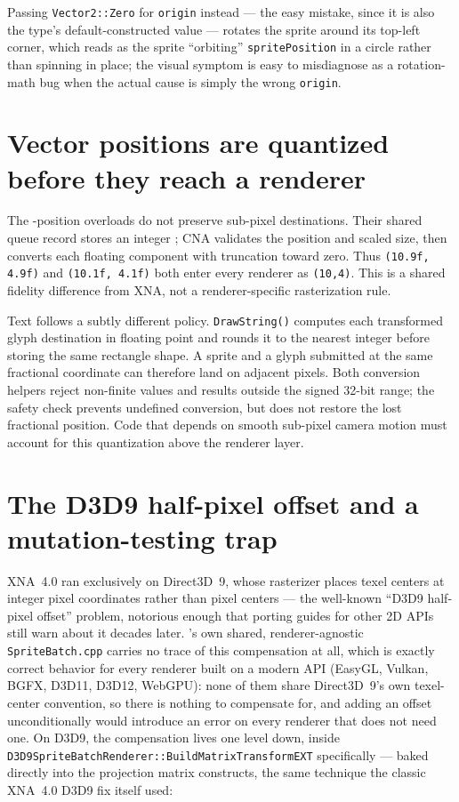 Passing \texttt{Vector2::Zero} for \texttt{origin} instead --- the easy mistake, since it is
also the type's default-constructed value --- rotates the sprite around its top-left corner,
which reads as the sprite ``orbiting'' \texttt{spritePosition} in a circle rather than spinning
in place; the visual symptom is easy to misdiagnose as a rotation-math bug when the actual
cause is simply the wrong \texttt{origin}.

\section{Vector positions are quantized before they reach a renderer}

The -position overloads do not preserve sub-pixel destinations. Their shared
queue record stores an integer ; CNA validates the position and scaled size,
then converts each floating component with truncation toward zero. Thus \texttt{(10.9f, 4.9f)}
and \texttt{(10.1f, 4.1f)} both enter every renderer as \texttt{(10,4)}. This is a shared
 fidelity difference from XNA, not a renderer-specific rasterization rule.

Text follows a subtly different policy. \texttt{DrawString()} computes each transformed glyph
destination in floating point and rounds it to the nearest integer before storing the same
rectangle shape. A sprite and a glyph submitted at the same fractional coordinate can therefore
land on adjacent pixels. Both conversion helpers reject non-finite values and results outside
the signed 32-bit range; the safety check prevents undefined conversion, but does not restore the
lost fractional position. Code that depends on smooth sub-pixel camera motion must account for
this quantization above the renderer layer.

\section{The D3D9 half-pixel offset and a mutation-testing trap}

XNA~4.0 ran exclusively on Direct3D~9, whose rasterizer places texel centers at integer
pixel coordinates rather than pixel centers --- the well-known ``D3D9 half-pixel offset''
problem, notorious enough that porting guides for other 2D APIs still warn about it decades
later. 's own shared, renderer-agnostic \texttt{SpriteBatch.cpp} carries
no trace of this compensation at all, which is exactly correct behavior for every renderer built
on a modern API (EasyGL, Vulkan, BGFX, D3D11, D3D12, WebGPU): none of them share Direct3D~9's
own texel-center convention, so there is nothing to compensate for, and adding an offset
unconditionally would introduce an error on every renderer that does not need one. On D3D9,
the compensation lives one level down,
inside \texttt{D3D9SpriteBatchRenderer::BuildMatrixTransformEXT} specifically --- baked directly
into the projection matrix  constructs, the same technique the classic
XNA~4.0 D3D9 fix itself used:

